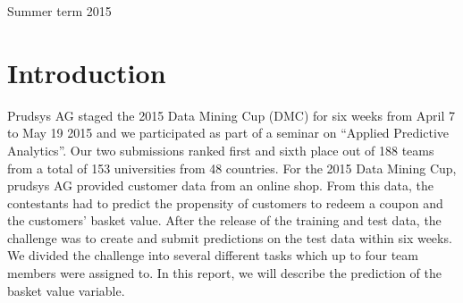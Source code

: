 \documentclass[12pt]{article}
\begin{document}
\begin{titlepage}


{\large Summer term 2015 }\\[1cm] %

\vspace{-25pt}
 

\vfill %

\end{titlepage}

\tableofcontents
\newpage

\section{Introduction}
Prudsys AG staged the 2015 Data Mining Cup (DMC) for six weeks from April 7 to May 19 2015 and we participated as part of a seminar on ``Applied Predictive Analytics''. Our two submissions ranked first and sixth place out of 188 teams from a total of 153 universities from 48 countries. 
For the 2015 Data Mining Cup, prudsys AG provided customer data from an online shop. From this data, the contestants had to predict the propensity of customers to redeem a coupon and the customers' basket value. After the release of the training and test data, the challenge was to create and submit predictions on the test data within six weeks. We divided the challenge into several different tasks which up to four team members were assigned to. In this report, we will describe the prediction of the basket value variable.\\ 
\end{document}
